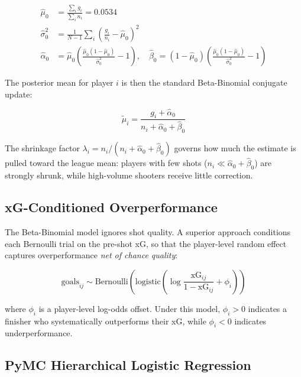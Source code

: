 \documentclass[12pt,a4paper]{article}
\begin{document}
\begin{align}
\hat{\mu}_0 &= \frac{\sum_i g_i}{\sum_i n_i} = 0.0534 \label{eq:mu0} \\[4pt]
\hat{\sigma}^2_0 &= \frac{1}{N-1}\sum_i \left(\frac{g_i}{n_i} - \hat{\mu}_0\right)^2 \label{eq:sigma2} \\[4pt]
\hat{\alpha}_0 &= \hat{\mu}_0 \left(\frac{\hat{\mu}_0(1-\hat{\mu}_0)}{\hat{\sigma}^2_0} - 1\right), \quad
\hat{\beta}_0 = (1 - \hat{\mu}_0) \left(\frac{\hat{\mu}_0(1-\hat{\mu}_0)}{\hat{\sigma}^2_0} - 1\right) \label{eq:ab}
\end{align}

The posterior mean for player $i$ is then the standard Beta-Binomial conjugate update:

\begin{equation}
\tilde{\mu}_i = \frac{g_i + \hat{\alpha}_0}{n_i + \hat{\alpha}_0 + \hat{\beta}_0}
\label{eq:eb_posterior}
\end{equation}

The shrinkage factor $\lambda_i = n_i / (n_i + \hat{\alpha}_0 + \hat{\beta}_0)$ governs how much the estimate is pulled toward the league mean: players with few shots ($n_i \ll \hat{\alpha}_0 + \hat{\beta}_0$) are strongly shrunk, while high-volume shooters receive little correction.

\subsection{xG-Conditioned Overperformance}
\label{sec:overperf}

The Beta-Binomial model ignores shot quality. A superior approach conditions each Bernoulli trial on the pre-shot xG, so that the player-level random effect captures overperformance \emph{net of chance quality}:

\begin{equation}
\text{goals}_{ij} \sim \text{Bernoulli}\!\left(\text{logistic}\!\left(\log\!\frac{\text{xG}_{ij}}{1 - \text{xG}_{ij}} + \phi_i\right)\right)
\label{eq:overperf}
\end{equation}

where $\phi_i$ is a player-level log-odds offset. Under this model, $\phi_i > 0$ indicates a finisher who systematically outperforms their xG, while $\phi_i < 0$ indicates underperformance.

\subsection{PyMC Hierarchical Logistic Regression}
\label{sec:pymc}
\end{document}
